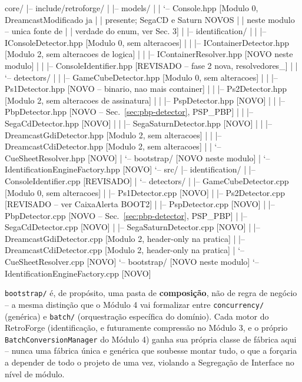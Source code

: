 \begin{CaixaArvore}
core/
|-- include/retroforge/
|   |-- models/
|   |   `-- Console.hpp              [Modulo 0, DreamcastModificado ja
|   |                                  presente; SegaCD e Saturn NOVOS
|   |                                  neste modulo -- unica fonte de
|   |                                  verdade do enum, ver Sec. 3]
|   |-- identification/
|   |   |-- IConsoleDetector.hpp     [Modulo 0, sem alteracoes]
|   |   |-- IContainerDetector.hpp   [Modulo 2, sem alteracoes de logica]
|   |   |-- IContainerResolver.hpp   [NOVO neste modulo]
|   |   |-- ConsoleIdentifier.hpp    [REVISADO -- fase 2 nova, resolvedores_]
|   |   `-- detectors/
|   |       |-- GameCubeDetector.hpp     [Modulo 0, sem alteracoes]
|   |       |-- Ps1Detector.hpp          [NOVO -- binario, nao mais container]
|   |       |-- Ps2Detector.hpp          [Modulo 2, sem alteracoes de assinatura]
|   |       |-- PspDetector.hpp          [NOVO]
|   |       |-- PbpDetector.hpp          [NOVO -- Sec.~\ref{sec:pbp-detector}, PSP_PBP]
|   |       |-- SegaCdDetector.hpp       [NOVO]
|   |       |-- SegaSaturnDetector.hpp   [NOVO]
|   |       |-- DreamcastGdiDetector.hpp [Modulo 2, sem alteracoes]
|   |       |-- DreamcastCdiDetector.hpp [Modulo 2, sem alteracoes]
|   |       `-- CueSheetResolver.hpp     [NOVO]
|   `-- bootstrap/                       [NOVO neste modulo]
|       `-- IdentificationEngineFactory.hpp [NOVO]
`-- src/
    |-- identification/
    |   |-- ConsoleIdentifier.cpp        [REVISADO]
    |   `-- detectors/
    |       |-- GameCubeDetector.cpp     [Modulo 0, sem alteracoes]
    |       |-- Ps1Detector.cpp          [NOVO]
    |       |-- Ps2Detector.cpp          [REVISADO -- ver CaixaAlerta BOOT2]
    |       |-- PspDetector.cpp          [NOVO]
    |       |-- PbpDetector.cpp          [NOVO -- Sec.~\ref{sec:pbp-detector}, PSP_PBP]
    |       |-- SegaCdDetector.cpp       [NOVO]
    |       |-- SegaSaturnDetector.cpp   [NOVO]
    |       |-- DreamcastGdiDetector.cpp [Modulo 2, header-only na pratica]
    |       |-- DreamcastCdiDetector.cpp [Modulo 2, header-only na pratica]
    |       `-- CueSheetResolver.cpp     [NOVO]
    `-- bootstrap/                       [NOVO neste modulo]
        `-- IdentificationEngineFactory.cpp [NOVO]
\end{CaixaArvore}

\begin{CaixaInfo}
\texttt{bootstrap/} é, de propósito, uma pasta de \textbf{composição}, não de regra de negócio -- a mesma distinção que o Módulo 4 vai formalizar entre \texttt{concurrency/} (genérica) e \texttt{batch/} (orquestração específica do domínio). Cada motor do RetroForge (identificação, e futuramente compressão no Módulo 3, e o próprio \texttt{BatchConversionManager} do Módulo 4) ganha sua própria classe de fábrica aqui -- nunca uma fábrica única e genérica que soubesse montar tudo, o que a forçaria a depender de todo o projeto de uma vez, violando a Segregação de Interface no nível de módulo.
\end{CaixaInfo}

